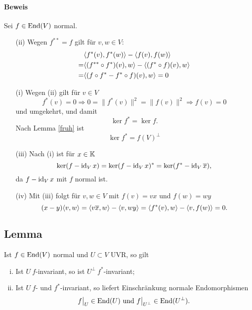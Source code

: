 \paragraph{Beweis}
	Sei $ f\in \operatorname{End}(V) $ normal.
		\begin{enumerate}
			\item[(ii)] Wegen $ f^{**} = f $ gilt für $ v,w\in V $:
				\begin{align*}
					&\langle f^*(v),f^*(w) \rangle-\langle f(v),f(w) \rangle \\
					= &\langle (f^{**}\circ f^*)(v),w \rangle-\langle (f^*\circ f)(v),w \rangle\\
					= &\langle (f\circ f^*-f^*\circ f)(v),w \rangle = 0
				\end{align*}
			\item[(i)] Wegen (ii) gilt für $ v\in V $
				\[ f^*(v) = 0 \Rightarrow 0 = \|f^*(v)\|^2 = \|f(v)\|^2\Rightarrow f(v) = 0 \]
				und umgekehrt, und damit
				\[ \ker f^* = \ker f. \]
				Nach Lemma \ref{fruh} ist
					\[ \ker f^* = f(V)^\perp \]
			\item[(iii)] Nach (i) ist für $ x\in \mathbb{K} $
				\[ \ker(f-\operatorname{id}_Vx) = \ker(f-\operatorname{id}_Vx)^* = \ker(f^*-\operatorname{id}_V\overline{x}), \]
				da $ f-\operatorname{id}_Vx $ mit $ f $ normal ist.
			\item[(iv)] Mit (iii) folgt für $ v,w\in V $ mit $ f(v) = vx $ und $ f(w) = wy $	\[ (x-y)\langle v,w \rangle=\langle v\overline{x},w \rangle-\langle v,wy \rangle = \langle f^*(v),w \rangle-\langle v,f(w) \rangle = 0. \] 
		\end{enumerate}

\subsection{Lemma}
\begin{Lemma}[]
	Ist $ f\in \operatorname{End}(V) $ normal und $ U\subset V $ UVR, so gilt
		\begin{enumerate}[(i)]
			\item Ist $ U\ f $-invariant, so ist $ U^\perp\ f^* $-invariant;
			\item Ist $ U\ f $- und $ f^* $-invariant, so liefert Einschränkung normale Endomorphismen
				\[ f\big|_U \in \operatorname{End}(U) \text{ und } f\big|_{U^\perp}\in \operatorname{End}(U^\perp). \]
		\end{enumerate}
\end{Lemma}
